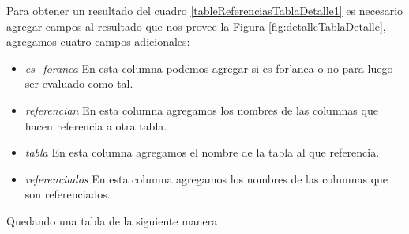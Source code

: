 Para obtener un resultado del cuadro \ref{tableReferenciasTablaDetalle1} es necesario agregar campos al resultado que nos provee la Figura \ref{fig:detalleTablaDetalle}, agregamos cuatro campos adicionales:
\begin{itemize}
	\item \textit{es\_foranea} En esta columna podemos agregar si es for'anea o no para luego ser evaluado como tal.
	\item \textit{referencian} En esta columna agregamos los nombres de las columnas que hacen referencia a otra tabla.
	\item \textit{tabla} En esta columna agregamos el nombre de la tabla al que referencia.
	\item \textit{referenciados} En esta columna agregamos los nombres de las columnas que son referenciados.
\end{itemize}
Quedando una tabla de la siguiente manera

